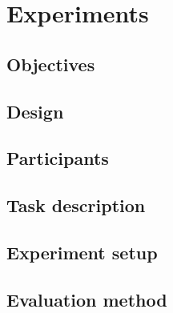 \chapter{Experiments}
\label{ch:experiments}
\section{Objectives}
\section{Design}
\section{Participants}
\section{Task description}
\section{Experiment setup}
\section{Evaluation method}
